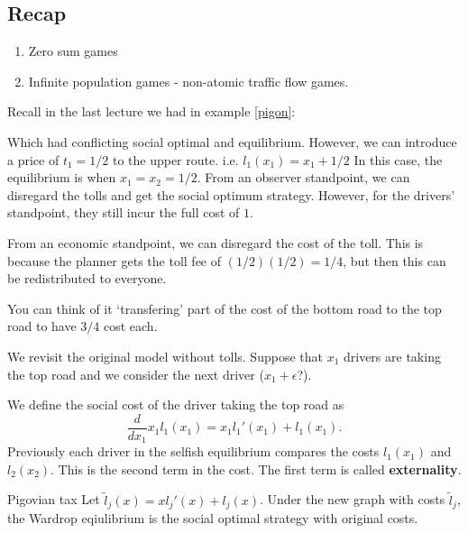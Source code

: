 \newsection
\subsection*{Recap}
\begin{enumerate}
    \item Zero sum games
    \item Infinite population games - non-atomic traffic flow games.
\end{enumerate}
Recall in the last lecture we had in example \ref{pigon}:
\begin{center}
\end{center}
Which had conflicting social optimal and equilibrium. However, we can introduce a price of $t_1=1/2$ to the upper route. i.e. $l_1(x_1)=x_1+1/2$ In this case, the equilibrium is when $x_1=x_2=1/2$. From an observer standpoint, we can disregard the tolls and get the social optimum strategy. However, for the drivers' standpoint, they still incur the full cost of $1$.

From an economic standpoint, we can disregard the cost of the toll. This is because the planner gets the toll fee of $(1/2)(1/2)=1/4$, but then this can be redistributed to everyone. 
\begin{remark}
    You can think of it `transfering' part of the cost of the bottom road to the top road to have $3/4$ cost each.
\end{remark}

We revisit the original model without tolls. Suppose that $x_1$ drivers are taking the top road and we consider the next driver ($x_1+\epsilon$?).

We define the social cost of the driver taking the top road as \[
\frac{d}{dx_1}x_1l_1(x_1)= x_1l_1'(x_1)+l_1(x_1).
\]
Previously each driver in the selfish equilibrium compares the costs $l_1(x_1)$ and $l_2(x_2)$. This is the second term in the cost. The first term is called \textbf{externality}.
\begin{atheorem}{Pigovian tax}{}
    Let $\tilde{l}_j(x)=xl_j'(x)+l_j(x)$. Under the new graph with costs $\tilde{l}_j$, the Wardrop eqiulibrium is the social optimal strategy with original costs.
\end{atheorem}

